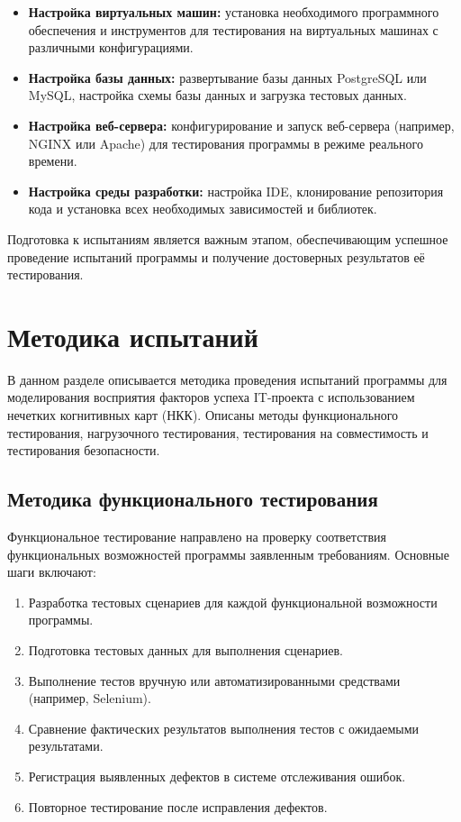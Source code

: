 \documentclass{article}
\begin{document}
    \begin{itemize}
        \item \textbf{Настройка виртуальных машин:} установка необходимого программного обеспечения и инструментов для тестирования на виртуальных машинах с различными конфигурациями.
        \item \textbf{Настройка базы данных:} развертывание базы данных PostgreSQL или MySQL, настройка схемы базы данных и загрузка тестовых данных.
        \item \textbf{Настройка веб-сервера:} конфигурирование и запуск веб-сервера (например, NGINX или Apache) для тестирования программы в режиме реального времени.
        \item \textbf{Настройка среды разработки:} настройка IDE, клонирование репозитория кода и установка всех необходимых зависимостей и библиотек.
    \end{itemize}

    Подготовка к испытаниям является важным этапом, обеспечивающим успешное проведение испытаний программы и получение достоверных результатов её тестирования.
    \newpage
    \section{Методика испытаний}

    В данном разделе описывается методика проведения испытаний программы для моделирования восприятия факторов успеха IT-проекта с использованием нечетких когнитивных карт (НКК). Описаны методы функционального тестирования, нагрузочного тестирования, тестирования на совместимость и тестирования безопасности.

    \subsection{Методика функционального тестирования}

    Функциональное тестирование направлено на проверку соответствия функциональных возможностей программы заявленным требованиям.
    Основные шаги включают\cite{litlink8}:

    \begin{enumerate}
        \item Разработка тестовых сценариев для каждой функциональной возможности программы.
        \item Подготовка тестовых данных для выполнения сценариев.
        \item Выполнение тестов вручную или автоматизированными средствами (например, Selenium).
        \item Сравнение фактических результатов выполнения тестов с ожидаемыми результатами.
        \item Регистрация выявленных дефектов в системе отслеживания ошибок.
        \item Повторное тестирование после исправления дефектов.
    \end{enumerate}
\end{document}
